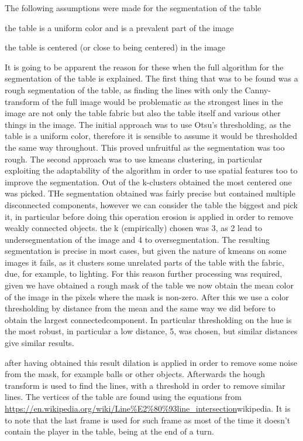 The following assumptions were made for the segmentation of the table
\begin{list}
    \item the table is a uniform color and is a prevalent part of the image
    \item the table is centered (or close to being centered) in the image
\end{list}

It is going to be apparent the reason for these when the full algorithm for
the segmentation of the table is explained.
The first thing that was to be found was a rough segmentation of the table,
as finding the lines with only the Canny-transform of the full image would 
be problematic as the strongest lines in the image are not only the table
fabric but also the table itself and various other things in the image.
The initial approach was to use Otsu's thresholding, as the table is a uniform
color, therefore it is sensible to assume it would be thresholded the same
way throughout. This proved unfruitful as the segmentation was too rough.
The second approach was to use kmeans clustering, in particular exploiting the
adaptability of the algorithm in order to use spatial features too to improve
the segmentation. Out of the k-clusters obtained the most centered one was picked.
THe segmentation obtained was fairly precise but contained multiple disconnected
components, however we can consider the table the biggest and pick it, in particular
before doing this operation erosion is applied in order to remove weakly connected objects.
the k (empirically) chosen was 3, as 2 lead to undersegmentation of the image and 4 to oversegmentation.
The resulting segmentation is precise in most cases, but given the nature of kmeans on some
images it fails, as it clusters some unrelated parts of the table with the fabric, due,
for example, to lighting.
For this reason further processing was required, given we have obtained a rough mask of
the table we now obtain the mean color of the image in the pixels where the mask is non-zero.
After this we use a color thresholding by distance from the mean and the same way we 
did before to obtain the largest connectedcomponent. In particular thresholding on the hue
is the most robust, in particular a low distance, 5, was chosen, but similar distances give similar
results.\par
after having obtained this result dilation is applied in order to remove some noise from the mask,
for example balls or other objects. Afterwards the hough transform is used to find the lines, 
with a threshold in order to remove similar lines.
The vertices of the table are found using the equations from \url{https://en.wikipedia.org/wiki/Line\%E2\%80\%93line_intersection}{wikipedia}.
It is to note that the last frame is used for such frame as most of the time it doesn't contain the player in the table, being at the end of
a turn.
